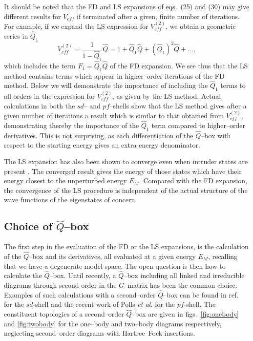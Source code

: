 It should be noted that the FD and LS expansions of eqs.\ (25) and (30)
may give different results for $V_{eff}$ if terminated after
a given, finite number of iterations. For example,
if we expand the LS expression for $V_{eff}^{(2)}$, 
we obtain a geometric series in $\hat{Q}_1$
\[
V_{eff}^{(2)}=\frac{1}{1-\hat{Q}_1} \hat{Q}=1+\hat{Q}_1 \hat{Q}+
(\hat{Q}_1 )^2 \hat{Q} + \dots ,
\]
which includes the term $F_1=\hat{Q}_1 \hat{Q}$ of the FD expansion.
We see thus that the LS method contains terms which appear in higher--order
iterations of the FD method.
Below we will demonstrate the importance of including
the $\hat{Q}_1$ terms to all orders in the expression for $V_{eff}^{(2)}$,
as given by the LS method. Actual calculations in both the $sd$-- and
$pf$--shells show that the LS method gives after a given number of iterations
a result which is similar to that obtained from $V_{eff}^{(2)}$,
demonstrating thereby the importance of the $\hat{Q}_1$ term compared
to higher--order derivatives. This is not surprising, as each differentiation
of the $\hat{Q}$--box with respect to the starting energy gives an extra
energy denominator.

The LS expansion has also been shown to converge even when intruder
states are present \cite{ls80}. The converged result gives the energy
of those states which have their energy closest to the unperturbed energy $E_M$.
Compared with the FD expansion, the convergence of the LS procedure is
independent of the actual structure of the wave functions of the
eigenstates of concern.

\subsection{Choice of $\hat{Q}$--box}
The first step in the evaluation of the FD or the LS expansions, is the
calculation of the $\hat{Q}$--box and its derivatives, all evaluated
at a given energy
$E_M$, recalling that we have a degenerate model space.
The open question is then how to calculate the $\hat{Q}$--box. Until
recently, a $\hat{Q}$--box including all linked and irreducible diagrams
through second order in the $G$--matrix has been the common choice.
Examples of such calculations with a second--order
$\hat{Q}$--box can be found in ref.\ \cite{skd83} for the $sd$-shell
and the recent work of Polls {\em et al.} \cite{prm90} for the $pf$-shell.
The constituent topologies of a second--order $\hat{Q}$--box are given
in figs.\ \ref{fig:onebody} and \ref{fig:twobody} for the one--body
and two--body diagrams respectively, neglecting second--order diagrams
with Hartree--Fock insertions.



